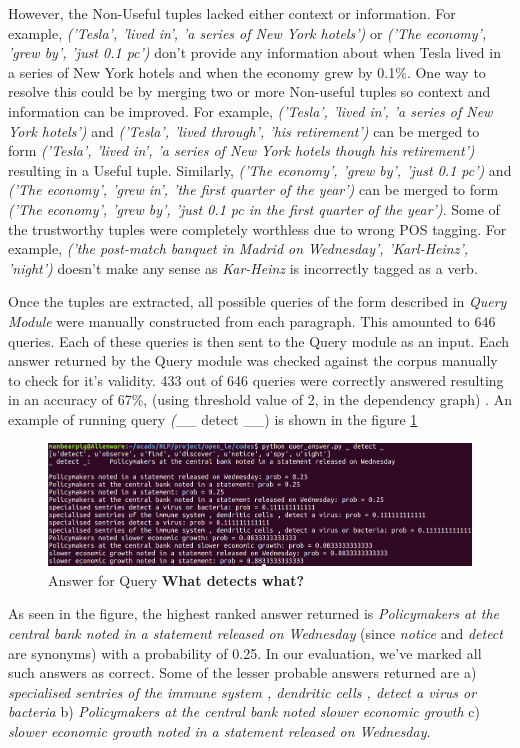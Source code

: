 \documentclass{article}
\begin{document}
However, the Non-Useful tuples lacked either context or information. For example, \textit{('Tesla', 'lived in', 'a series of New York hotels')} or \textit{('The economy', 'grew by', 'just 0.1 pc')} don't provide any information about when Tesla lived in a series of New York hotels and when the economy grew by 0.1\%. One way to resolve this could be by merging two or more Non-useful tuples so context and information can be improved. For example, \textit{('Tesla', 'lived in', 'a series of New York hotels')} and \textit{('Tesla', 'lived through', 'his retirement')} can be merged to form \textit{('Tesla', 'lived in', 'a series of New York hotels though his retirement')} resulting in a Useful tuple. Similarly, \textit{('The economy', 'grew by', 'just 0.1 pc')} and \textit{('The economy', 'grew in', 'the first quarter of the year')} can be merged to form \textit{('The economy', 'grew by', 'just 0.1 pc in the first quarter of the year')}. Some of the trustworthy tuples were completely worthless due to wrong POS tagging. For example, \textit{('the post-match banquet in Madrid on Wednesday', 'Karl-Heinz', 'night')} doesn't make any sense as \textit{Kar-Heinz} is incorrectly tagged as a verb.


Once the tuples are extracted, all possible queries of the form described in \textit{Query Module} were manually constructed from each paragraph. This amounted to $646$ queries. Each of these queries is then sent to the Query module as an input. Each answer returned by the Query module was checked against the corpus manually to check for it's validity. 433 out of 646 queries were correctly answered resulting in an accuracy of 67\%, (using threshold value of 2, in the dependency graph) . An example of running query \textit(\_\_ detect \_\_) is shown in the figure \ref{fig:query-ex}

\begin{figure}[h]
\centering
\includegraphics[width=1.0\textwidth]{query_ex.png}
\caption{Answer for Query \textbf{What detects what?}}
\label{fig:query-ex}
\end{figure}

As seen in the figure, the highest ranked answer returned is \textit{Policymakers at the central bank noted in a statement released on Wednesday} (since \textit{notice} and \textit{detect} are synonyms) with a probability of 0.25. In our evaluation, we've marked all such answers as correct. Some of the lesser probable answers returned  are a) \textit{specialised sentries of the immune system , dendritic cells , detect a virus or bacteria} b) \textit{Policymakers at the central bank noted slower economic growth} c) \textit{slower economic growth noted in a statement released on Wednesday}.
\end{document}
